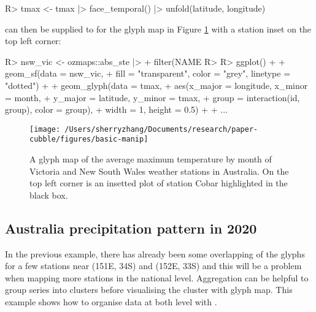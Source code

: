 \documentclass[
]{jss}
\begin{document}
\begin{CodeChunk}
\begin{CodeInput}
R> tmax <- tmax |> face_temporal() |> unfold(latitude, longitude)
\end{CodeInput}
\end{CodeChunk}

 can then be supplied to  for the glyph map in Figure \ref{fig:basic-manip} with a station inset on the top left corner:

\begin{CodeChunk}
\begin{CodeInput}
R> nsw_vic <- ozmaps::abs_ste |> 
+   filter(NAME %
R> 
R> ggplot() + 
+   geom_sf(data = nsw_vic, 
+           fill = "transparent", color = "grey", linetype = "dotted") + 
+   geom_glyph(data = tmax, 
+              aes(x_major = longitude, x_minor = month, 
+                  y_major = latitude, y_minor = tmax,
+                  group = interaction(id, group), color = group),
+              width = 1, height = 0.5) +
+   ...
\end{CodeInput}
\end{CodeChunk}

\begin{CodeChunk}
\begin{figure}

{\centering \texttt{[image: /Users/sherryzhang/Documents/research/paper-cubble/figures/basic-manip]} 

}

\caption[A glyph map of the average maximum temperature by month of Victoria and New South Wales weather stations in Australia]{A glyph map of the average maximum temperature by month of Victoria and New South Wales weather stations in Australia. On the top left corner is an insetted plot of station Cobar highlighted in the black box.}\label{fig:basic-manip}
\end{figure}
\end{CodeChunk}

\hypertarget{australia-precipitation-pattern-in-2020}{%
\subsection{Australia precipitation pattern in 2020}\label{australia-precipitation-pattern-in-2020}}

In the previous example, there has already been some overlapping of the glyphs for a few stations near (151E, 34S) and (152E, 33S) and this will be a problem when mapping more stations in the national level. Aggregation can be helpful to group series into clusters before visualising the cluster with glyph map. This example shows how to organise data at both level with .
\end{document}
